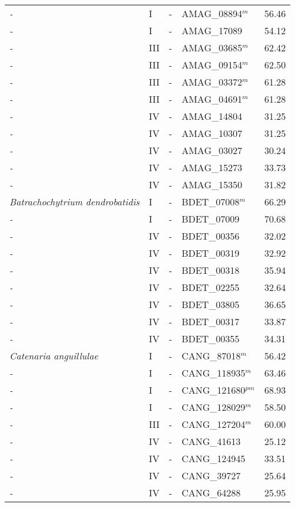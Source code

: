 {{\begin{longtable}{llllr}
  \emph{-} & I & - & AMAG\_08894$^{m}$ & 56.46 \\ 
  \emph{-} & I & - & AMAG\_17089 & 54.12 \\ 
  \emph{-} & III & - & AMAG\_03685$^{m}$ & 62.42 \\ 
  \emph{-} & III & - & AMAG\_09154$^{m}$ & 62.50 \\ 
  \emph{-} & III & - & AMAG\_03372$^{m}$ & 61.28 \\ 
  \emph{-} & III & - & AMAG\_04691$^{m}$ & 61.28 \\ 
  \emph{-} & IV & - & AMAG\_14804 & 31.25 \\ 
  \emph{-} & IV & - & AMAG\_10307 & 31.25 \\ 
  \emph{-} & IV & - & AMAG\_03027 & 30.24 \\ 
  \emph{-} & IV & - & AMAG\_15273 & 33.73 \\ 
  \emph{-} & IV & - & AMAG\_15350 & 31.82 \\ 
  \emph{Batrachochytrium dendrobatidis } & I & - & BDET\_07008$^{m}$ & 66.29 \\ 
  \emph{-} & I & - & BDET\_07009 & 70.68 \\ 
  \emph{-} & IV & - & BDET\_00356 & 32.02 \\ 
  \emph{-} & IV & - & BDET\_00319 & 32.92 \\ 
  \emph{-} & IV & - & BDET\_00318 & 35.94 \\ 
  \emph{-} & IV & - & BDET\_02255 & 32.64 \\ 
  \emph{-} & IV & - & BDET\_03805 & 36.65 \\ 
  \emph{-} & IV & - & BDET\_00317 & 33.87 \\ 
  \emph{-} & IV & - & BDET\_00355 & 34.31 \\ 
  \emph{Catenaria anguillulae} & I & - & CANG\_87018$^{m}$ & 56.42 \\ 
  \emph{-} & I & - & CANG\_118935$^{m}$ & 63.46 \\ 
  \emph{-} & I & - & CANG\_121680$^{pm}$ & 68.93 \\ 
  \emph{-} & I & - & CANG\_128029$^{m}$ & 58.50 \\ 
  \emph{-} & III & - & CANG\_127204$^{m}$ & 60.00 \\ 
  \emph{-} & IV & - & CANG\_41613 & 25.12 \\ 
  \emph{-} & IV & - & CANG\_124945 & 33.51 \\ 
  \emph{-} & IV & - & CANG\_39727 & 25.64 \\ 
  \emph{-} & IV & - & CANG\_64288 & 25.95 \\ 

\end{longtable}}}
